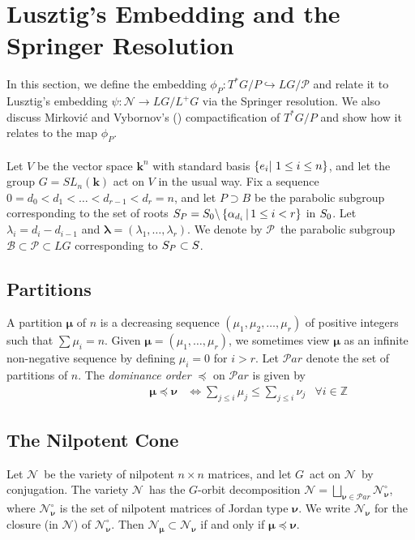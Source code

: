\documentclass[paper=a4, fontsize=10pt]{amsart} %
\theoremstyle{plain}
\theoremstyle{definition}
\theoremstyle{remark}
\numberwithin{equation}{section} %
\numberwithin{figure}{section} %
\numberwithin{table}{section} %
\numberwithin{subsection}{section} %
\def\mid{\,\middle\vert\,}
\def\Borel{\ensuremath{\mathcal B}}
\def\simple{\ensuremath{\Simple_0}}
\def\Simple{\ensuremath S}
\def\gl{\ensuremath{G}}
\def\gL{\ensuremath{L\gl}}
\def\gLhat{\gL}
\def\gOhat{\ensuremath{L^+\gl}}
\def\para{\ensuremath{P}}
\def\Para{\ensuremath{\mathcal P}}
\def\e{\ensuremath e}
\def\Lambda{\ensuremath{d}}
\def\Ni{\ensuremath{\mathcal N}}
\begin{document}
\section{Lusztig's Embedding and the Springer Resolution}
In this section, we define the embedding $\phi_P:T^*G/P\hookrightarrow\gL/\Para$ and relate it to Lusztig's embedding $\psi:\mathcal N\rightarrow\gL/\gOhat$ via the Springer resolution.
We also discuss Mirkovi\'c and Vybornov's (\cite{mv}) compactification of $T^*G/P$ and show how it relates to the map $\phi_P$.
\\
\\
Let $V$ be the vector space $\mathbf k^n$ with standard basis $\left\{\e_i\middle\vert\ 1\leq i\leq n\right\}$, and let the group $\gl=SL_n(\mathbf k)$ act on $V$ in the usual way. 
Fix a sequence $0=\Lambda_0<\Lambda_1<\ldots<\Lambda_{r-1}<\Lambda_r=n$, and let $P\supset B$ be the parabolic subgroup corresponding to the set of roots $\Simple_\para=\simple\backslash\left\{\alpha_{\Lambda_i}\mid 1\leq i<r\right\}$ in \simple.
Let $\lambda_i=\Lambda_i-\Lambda_{i-1}$ and $\boldsymbol\lambda=(\lambda_1,\ldots,\lambda_r)$.
We denote by \Para\ the parabolic subgroup $\Borel\subset\Para\subset\gLhat$ corresponding to $\Simple_\para\subset\Simple$. 

\subsection{Partitions}
A partition $\boldsymbol\mu$ of $n$ is a decreasing sequence $(\mu_1,\mu_2,\ldots,\mu_r)$ of positive integers such that $\sum\mu_i=n$.
Given $\boldsymbol\mu=(\mu_1,\ldots,\mu_r)$, we sometimes view $\boldsymbol\mu$ as an infinite non-negative sequence by defining $\mu_i=0$ for $i>r$.
Let $\mathcal Par$ denote the set of partitions of $n$.
The \emph{dominance order} $\preceq$ on $\mathcal Par$ is given by \begin{align*}
\hspace{80pt}\boldsymbol\mu\preceq\boldsymbol\nu&\iff\sum\limits_{j\leq i}\mu_j\leq\sum\limits_{j\leq i}\nu_j&\forall i\in\mathbb Z
\end{align*}

\subsection{The Nilpotent Cone}
Let \Ni\ be the variety of nilpotent $n\times n$ matrices, and let \gl\ act on \Ni\ by conjugation.
The variety \Ni\ has the \gl-orbit decomposition $\Ni=\bigsqcup\limits_{\boldsymbol\nu\in\mathcal Par}\Ni^\circ_{\boldsymbol\nu}$, where $\Ni_{\boldsymbol\nu}^\circ$ is the set of nilpotent matrices of Jordan type $\boldsymbol\nu$.
We write $\Ni_{\boldsymbol\nu}$ for the closure (in \Ni) of $\Ni_{\boldsymbol\nu}^\circ$.
Then $\Ni_{\boldsymbol\mu}\subset\Ni_{\boldsymbol\nu}$ if and only if $\boldsymbol\mu\preceq\boldsymbol\nu$.
\end{document}
